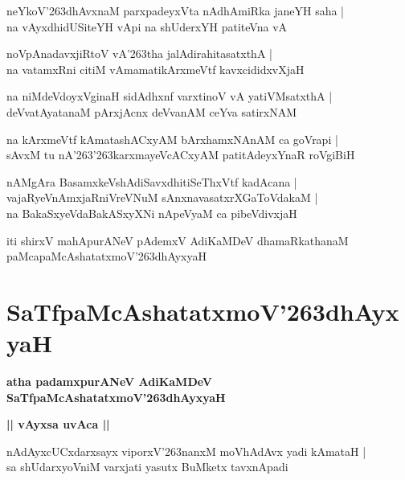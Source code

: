 \documentclass[twoside,12pt,openright]{book}
\def\S{\char'263}
\newcounter{shloka}[chapter]
\def\uvaca#1{\centerline{{\large\textbf{#1}}}}
\begin{document}
\begin{shloka}
neYkoV\S dhAvxnaM parxpadeyxVta nAdhAmiRka janeYH  saha |\\
na vAyxdhidUSiteYH vApi na shUderxYH patiteVna vA 
\end{shloka}

\begin{shloka}
noVpAnadavxjiRtoV vA\S tha jalAdirahitasatxthA |\\
na vatamxRni citiM vAmamatikArxmeVtf kavxcididxvXjaH  
\end{shloka}

\begin{shloka}
na niMdeVdoyxVginaH sidAdhxnf varxtinoV vA yatiVMsatxthA |\\
deVvatAyatanaM pArxjAcnx deVvanAM ceYva satirxNAM
\end{shloka}

\begin{shloka}
na kArxmeVtf kAmatashACxyAM bArxhamxNAnAM ca goVrapi |\\
sAvxM tu nA\S\S karxmayeVcACxyAM patitAdeyxYnaR roVgiBiH
\end{shloka}

\begin{shloka}
nAMgAra BasamxkeVshAdiSavxdhitiSeThxVtf kadAcana |\\
vajaRyeVnAmxjaRniVreVNuM sAnxnavasatxrXGaToVdakaM |\\
na BakaSxyeVdaBakASxyXNi nApeVyaM ca pibeVdivxjaH 
\end{shloka}

\begin{center}
iti shirxV mahApurANeV pAdemxV AdiKaMDeV dhamaRkathanaM paMcapaMcAshatatxmoV\S dhAyxyaH
\end{center}

\chapter{SaTfpaMcAshatatxmoV\S dhAyxyaH}

\begin{center}
{\LARGE\bfseries atha padamxpurANeV AdiKaMDeV SaTfpaMcAshatatxmoV\S dhAyxyaH}
\end{center}

\uvaca{|| vAyxsa uvAca ||}

\begin{shloka}
nAdAyxcUCxdarxsayx viporxV\S nanxM moVhAdAvx yadi kAmataH |\\
sa shUdarxyoVniM varxjati yasutx BuMketx tavxnApadi 
\end{shloka}
\end{document}
